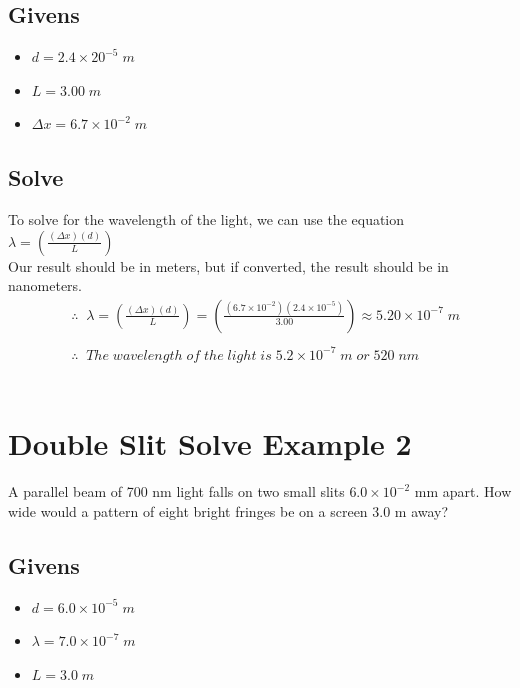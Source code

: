 \documentclass{article}
\begin{document}
\subsection*{Givens}
\begin{itemize}
    \item $d = 2.4 \times 20^{-5}\;m$
    \item $L = 3.00\;m $
    \item $\Delta x = 6.7 \times 10^{-2}\;m$
\end{itemize}\leavevmode
\subsection*{Solve}
To solve for the wavelength of the light, we can use the equation $\lambda = \left(\frac{(\Delta x)(d)}{L}\right)$\\ Our result should be in meters, but if converted, the result should be in nanometers.\\
\begin{align*}
     &\therefore\;\;\lambda = \left(\frac{(\Delta x)(d)}{L}\right) = \left(\frac{(6.7 \times 10^{-2})(2.4 \times 10^{-5})}{3.00}\right) \approx 5.20 \times 10^{-7}\;m\\\\
     &\therefore\;\;The\;wavelength\;of\;the\;light\;is\;5.2 \times 10^{-7}\;m\;or\;520\;nm
\end{align*}\leavevmode\\

\section{Double Slit Solve Example 2}
A parallel beam of 700 nm light falls on two small slits $6.0 \times 10^{-2}$ mm apart. How wide would a pattern of eight bright fringes be on a screen 3.0 m away?
\subsection*{Givens}
\begin{itemize}
    \item $d = 6.0 \times 10^{-5}\;m$
    \item $\lambda = 7.0 \times 10^{-7}\;m$
    \item $L = 3.0\;m$
\end{itemize}\leavevmode
\end{document}
